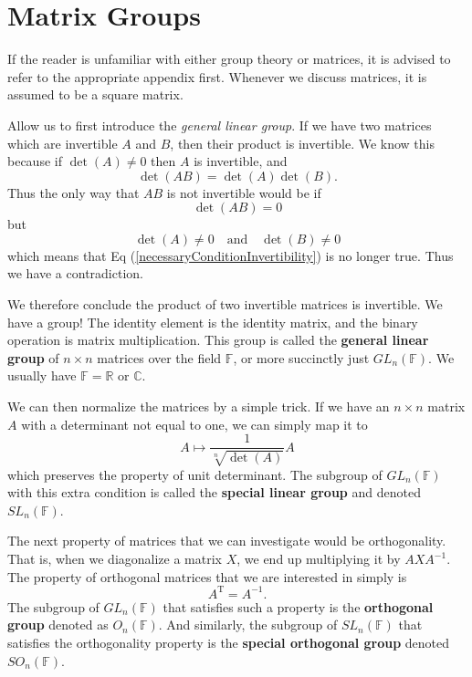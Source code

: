 \section{Matrix Groups}

If the reader is unfamiliar with either group theory or matrices, it is advised 
to refer to the appropriate appendix first. Whenever we discuss matrices, it is
assumed to be a square matrix.

Allow us to first introduce the \emph{general linear group}. If we have two 
matrices which are invertible $A$ and $B$, then their product is invertible.
We know this because if $\det(A)\neq 0$ then $A$ is invertible, and
\begin{equation}
\det(AB)=\det(A)\det(B).
\end{equation}
Thus the only way that $AB$ is not invertible would be if
\begin{equation}\label{necessaryConditionInvertibility}
\det(AB) = 0
\end{equation}
but
\begin{equation}
\det(A)\neq 0 \quad\textrm{and}\quad\det(B)\neq 0
\end{equation}
which means that Eq (\ref{necessaryConditionInvertibility}) is no longer true.
Thus we have a contradiction.

We therefore conclude the product of two invertible matrices is invertible. We
have a group! The identity element is the identity matrix, and the binary
operation is matrix multiplication. This group is called the \textbf{general
linear group} of $n\times n$ matrices over the field $\mathbb{F}$, or more
succinctly just $GL_{n}(\mathbb{F})$. We usually have $\mathbb{F}=\mathbb{R}$ or
$\mathbb{C}$.

We can then normalize the matrices by a simple
trick. If we have an $n\times n$ matrix $A$ with a determinant not equal to one,
we can simply map it to
\begin{equation}
A\mapsto\frac{1}{\sqrt[n]{\det(A)}}A
\end{equation}
which preserves the property of unit determinant. The subgroup of $GL_{n}(\mathbb{F})$
with this extra condition is called the \textbf{special linear group} and denoted
$SL_{n}(\mathbb{F})$.

The next property of matrices that we can investigate would be orthogonality. 
That is, when we diagonalize a matrix $X$, we end up multiplying it by $AXA^{-1}$.
The property of orthogonal matrices that we are interested in simply is
\begin{equation}
A^\textrm{T} = A^{-1}.
\end{equation}
The subgroup of $GL_{n}(\mathbb{F})$ that satisfies such a property is the
\textbf{orthogonal group} denoted as $O_{n}(\mathbb{F})$. And similarly, the
subgroup of $SL_{n}(\mathbb{F})$ that satisfies the orthogonality property is
the \textbf{special orthogonal group} denoted $SO_{n}(\mathbb{F})$.

